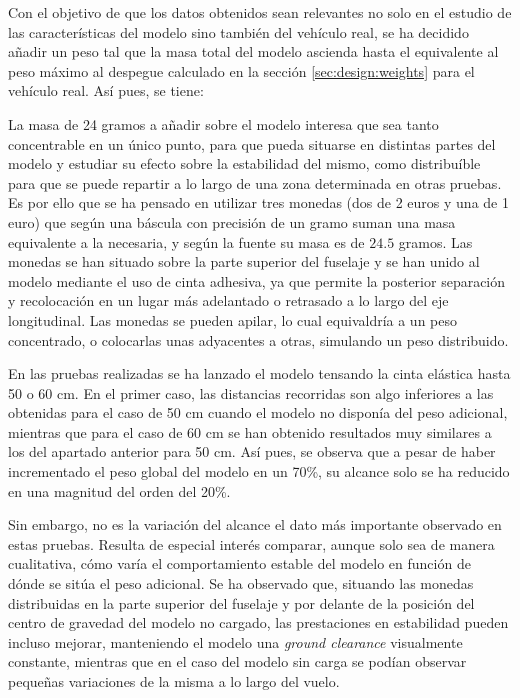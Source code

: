 Con el objetivo de que los datos obtenidos sean relevantes no solo en el estudio de las características del modelo sino también del vehículo real, se ha decidido añadir un peso tal que la masa total del modelo ascienda hasta el equivalente al peso máximo al despegue calculado en la sección \ref{sec:design:weights} para el vehículo real. Así pues, se tiene:

La masa de 24 gramos a añadir sobre el modelo interesa que sea tanto concentrable en un único punto, para que pueda situarse en distintas partes del modelo y estudiar su efecto sobre la estabilidad del mismo, como distribuíble para que se puede repartir a lo largo de una zona determinada en otras pruebas. Es por ello que se ha pensado en utilizar tres monedas (dos de 2 euros y una de 1 euro) que según una báscula con precisión de un gramo suman una masa equivalente a la necesaria, y según la fuente \cite{ref:pesomonedas} su masa es de $24.5$ gramos. Las monedas se han situado sobre la parte superior del fuselaje y se han unido al modelo mediante el uso de cinta adhesiva, ya que permite la posterior separación y recolocación en un lugar más adelantado o retrasado a lo largo del eje longitudinal. Las monedas se pueden apilar, lo cual equivaldría a un peso concentrado, o colocarlas unas adyacentes a otras, simulando un peso distribuido.

En las pruebas realizadas se ha lanzado el modelo tensando la cinta elástica hasta 50 o 60 cm. En el primer caso, las distancias recorridas son algo inferiores a las obtenidas para el caso de 50 cm cuando el modelo no disponía del peso adicional, mientras que para el caso de 60 cm se han obtenido resultados muy similares a los del apartado anterior para 50 cm. Así pues, se observa que a pesar de haber incrementado el peso global del modelo en un 70\%, su alcance solo se ha reducido en una magnitud del orden del 20\%.

Sin embargo, no es la variación del alcance el dato más importante observado en estas pruebas. Resulta de especial interés comparar, aunque solo sea de manera cualitativa, cómo varía el comportamiento estable del modelo en función de dónde se sitúa el peso adicional. Se ha observado que, situando las monedas distribuidas en la parte superior del fuselaje y por delante de la posición del centro de gravedad del modelo no cargado, las prestaciones en estabilidad pueden incluso mejorar, manteniendo el modelo una \emph{ground clearance} visualmente constante, mientras que en el caso del modelo sin carga se podían observar pequeñas variaciones de la misma a lo largo del vuelo.

